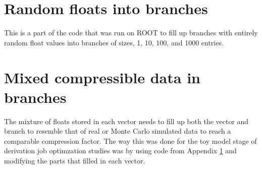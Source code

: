\section{Random floats into branches}
\label{appendix:toy_model_no_mix_code}

This is a part of the code that was run on ROOT to fill up branches with entirely random float values into branches of sizes, 1, 10, 100, and 1000 entries.


\section{Mixed compressible data in branches}
\label{appendix:toy_model_WITH_mix_code}
The mixture of floats stored in each vector needs to fill up both the vector and branch to resemble that of real or Monte Carlo simulated data to reach a comparable compression factor.
The way this was done for the toy model stage of derivation job optimzation studies was by using code from Appendix \ref{appendix:toy_model_no_mix_code} and modifying the parts that filled in each vector.

 